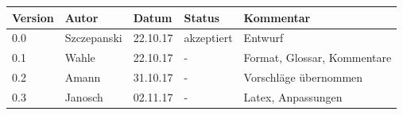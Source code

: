 \documentclass[11pt,a4paper]{article}
\begin{document}
	
	
	\pagebreak
	\begin{tabular}{|l|l|l|l|l|}
		\hline 
		\textbf{Version} & \textbf{Autor} & \textbf{Datum} & \textbf{Status} & \textbf{Kommentar} \\ 
		\hline 
		0.0 & Szczepanski & 22.10.17 & akzeptiert & Entwurf \\ 
		\hline 
		0.1 & Wahle & 22.10.17 & - & Format, Glossar, Kommentare \\ 
		\hline 
		0.2 & Amann & 31.10.17 & - & Vorschläge übernommen \\ 
		\hline 
		0.3 & Janosch & 02.11.17 & - & Latex, Anpassungen \\ 
		\hline 
	\end{tabular} 
	
	\pagebreak
	\tableofcontents
	
	
	\renewcommand{\familydefault}{\sfdefault}

	
	\pagebreak
\end{document}
